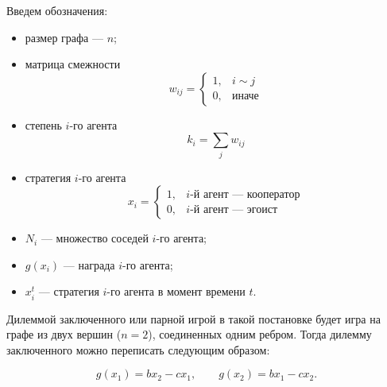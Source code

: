 \documentclass[12pt]{extarticle}
\begin{document}
Введем обозначения:
\begin{itemize}
\item размер графа --- $n$;
\item матрица смежности
\[
w_{ij} = \begin{cases} 1, & i \sim j \\ 0, & \text{иначе} \end{cases}
\]
\item степень $i$-го агента
\[
k_i = \sum_j w_{ij}
\]
\item стратегия $i$-го агента
\[
x_i = \begin{cases} 1, & \text{$i$-й агент --- кооператор} \\ 0, & \text{$i$-й агент --- эгоист} \end{cases}
\]
\item $N_i$ --- множество соседей $i$-го агента;
\item $g(x_i)$ --- награда $i$-го агента;
\item $x_i^t$ --- стратегия $i$-го агента в момент времени $t$.
\end{itemize}

Дилеммой заключенного или парной игрой в такой постановке будет игра на графе из двух вершин ($n = 2$), соединенных одним ребром. Тогда дилемму заключенного можно переписать следующим образом:

\[
g(x_1) = b x_2 - c x_1, \qquad g(x_2) = b x_1 - c x_2 .
\]



\end{document}
